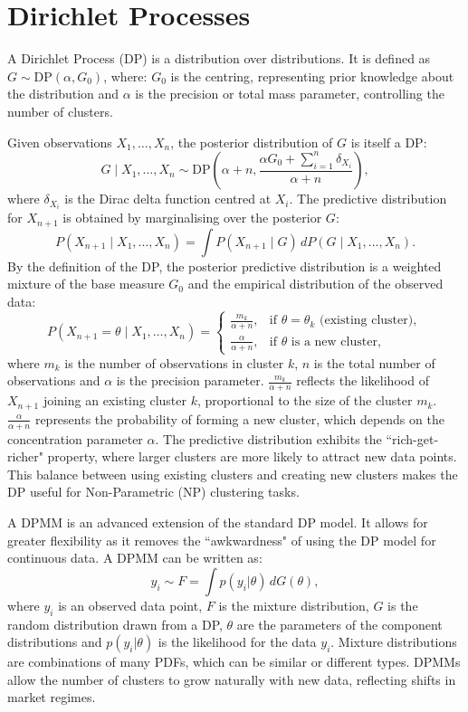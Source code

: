\documentclass[12pt]{report} %
\begin{document}
\section{Dirichlet Processes}
A Dirichlet Process (DP)  is a distribution over distributions.\cite{perrakis2024nonparametric} It is defined as $G \sim \text{DP}(\alpha, G_0)$, where: \( G_0 \) is the centring, representing prior knowledge about the distribution and \( \alpha \) is the precision or total mass parameter, controlling the number of clusters.\cite{perrakis2024nonparametric}

\noindent Given observations \( X_1, \dots, X_n \), the posterior distribution of \( G \) is itself a DP:
\[
G \mid X_1, \dots, X_n \sim \text{DP} \left( \alpha + n, \frac{\alpha G_0 + \sum_{i=1}^n \delta_{X_i}}{\alpha + n} \right),
\]
where \( \delta_{X_i} \) is the Dirac delta function centred at \( X_i \).\cite{Xing2014DirichletProcesses} The predictive distribution for \( X_{n+1} \) is obtained by marginalising over the posterior \( G \):
\[
P(X_{n+1} \mid X_1, \dots, X_n) = \int P(X_{n+1} \mid G) \, dP(G \mid X_1, \dots, X_n).
\]
By the definition of the DP, the posterior predictive distribution is a weighted mixture of the base measure \( G_0 \) and the empirical distribution of the observed data:
\[
P(X_{n+1} = \theta \mid X_1, \dots, X_n) =
\begin{cases} 
\frac{m_k}{\alpha + n}, & \text{if } \theta = \theta_k \text{ (existing cluster)}, \\
\frac{\alpha}{\alpha + n}, & \text{if } \theta \text{ is a new cluster},
\end{cases}
\]
where \( m_k \) is the number of observations in cluster \( k \), \( n \) is the total number of observations and \( \alpha \) is the precision parameter.\cite{Xing2014DirichletProcesses}
\( \frac{m_k}{\alpha + n} \) reflects the likelihood of \( X_{n+1} \) joining an existing cluster \( k \), proportional to the size of the cluster \( m_k \). \( \frac{\alpha}{\alpha + n} \) represents the probability of forming a new cluster, which depends on the concentration parameter \( \alpha \). The predictive distribution exhibits the ``rich-get-richer" property, where larger clusters are more likely to attract new data points.\cite{Xing2014DirichletProcesses} This balance between using existing clusters and creating new clusters makes the DP useful for Non-Parametric (NP) clustering tasks.

A DPMM is an advanced extension of the standard DP model. It allows for greater flexibility as it removes the ``awkwardness" of using the DP model for continuous data.\cite{perrakis2024nonparametric}  A DPMM can be written as:
\[
y_i \sim F = \int p(y_i | \theta) \, dG(\theta),
\]
where \( y_i \) is an observed data point, \( F \) is the mixture distribution, \( G \) is the random distribution drawn from a DP, \( \theta \) are the parameters of the component distributions and \( p(y_i | \theta) \) is the likelihood for the data \( y_i \). Mixture distributions are combinations of many PDFs, which can be similar or different types.\cite{KHALEDKHAMEES2022101613} DPMMs allow the number of clusters to grow naturally with new data, reflecting shifts in market regimes.
\end{document}

